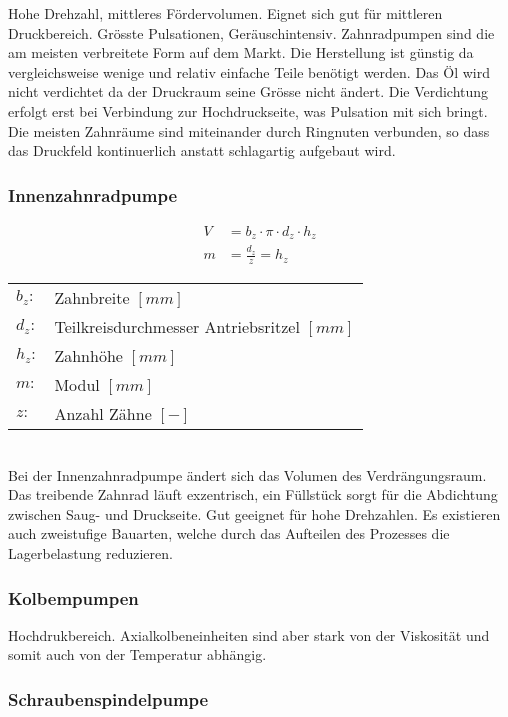Hohe Drehzahl, mittleres Fördervolumen. Eignet sich gut für mittleren Druckbereich. Grösste Pulsationen, Geräuschintensiv. Zahnradpumpen sind die am meisten verbreitete Form auf dem Markt. Die Herstellung ist günstig da vergleichsweise wenige und relativ einfache Teile benötigt werden. Das Öl wird nicht verdichtet da der Druckraum seine Grösse nicht ändert. Die Verdichtung erfolgt erst bei Verbindung zur Hochdruckseite, was Pulsation mit sich bringt. Die meisten Zahnräume sind miteinander durch Ringnuten verbunden, so dass das Druckfeld kontinuerlich anstatt schlagartig aufgebaut wird. 


\subsubsection{Innenzahnradpumpe}

\begin{align*}
V &= b_z \cdot \pi \cdot d_z \cdot h_z \\
m &= \frac{d_z}{z} = h_z
\end{align*}

\begin{tabular}{ll}
$b_z:$ & Zahnbreite $[mm]$\\
$d_z:$& Teilkreisdurchmesser Antriebsritzel $[mm]$\\
$h_z:$& Zahnhöhe $[mm]$\\
$m:$& Modul $[mm]$\\
$z:$& Anzahl Zähne $[-]$
\end{tabular} \\

Bei der Innenzahnradpumpe ändert sich das Volumen des Verdrängungsraum. Das treibende Zahnrad läuft exzentrisch, ein Füllstück sorgt für die Abdichtung zwischen Saug- und Druckseite. Gut geeignet für hohe Drehzahlen. Es existieren auch zweistufige Bauarten, welche durch das Aufteilen des Prozesses die Lagerbelastung reduzieren. 


\subsubsection{Kolbempumpen}
Hochdrukbereich. Axialkolbeneinheiten sind aber stark von der Viskosität und somit auch von der Temperatur abhängig. 



\subsubsection{Schraubenspindelpumpe}

